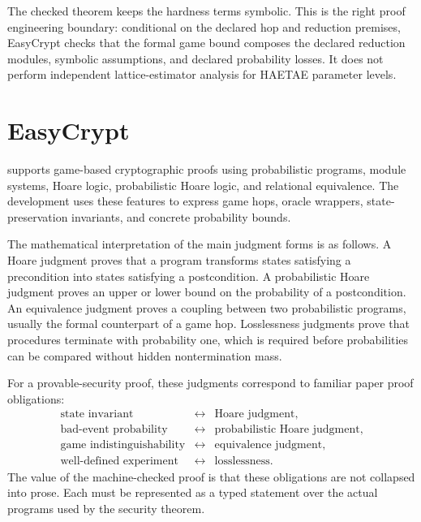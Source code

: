 The checked theorem keeps the hardness terms symbolic.  This is the right proof
engineering boundary: conditional on the declared hop and reduction premises,
EasyCrypt checks that the formal game bound composes the declared reduction
modules, symbolic assumptions, and declared probability losses.  It does not
perform independent lattice-estimator analysis for HAETAE parameter levels.

\section{EasyCrypt}

\easycrypt{} supports game-based cryptographic proofs using probabilistic
programs, module systems, Hoare logic, probabilistic Hoare logic, and relational
equivalence.  The \haetae{} development uses these features to express game
hops, oracle wrappers, state-preservation invariants, and concrete probability
bounds.

The mathematical interpretation of the main judgment forms is as follows.
A Hoare judgment proves that a program transforms states satisfying a
precondition into states satisfying a postcondition.  A probabilistic Hoare
judgment proves an upper or lower bound on the probability of a postcondition.
An equivalence judgment proves a coupling between two probabilistic programs,
usually the formal counterpart of a game hop.  Losslessness judgments prove that
procedures terminate with probability one, which is required before probabilities
can be compared without hidden nontermination mass.

For a provable-security proof, these judgments correspond to familiar paper
proof obligations:
\[
\begin{array}{rcl}
\text{state invariant} &\leftrightarrow& \text{Hoare judgment},\\
\text{bad-event probability} &\leftrightarrow& \text{probabilistic Hoare judgment},\\
\text{game indistinguishability} &\leftrightarrow& \text{equivalence judgment},\\
\text{well-defined experiment} &\leftrightarrow& \text{losslessness}.
\end{array}
\]
The value of the machine-checked proof is that these obligations are not
collapsed into prose.  Each must be represented as a typed statement over the
actual programs used by the security theorem.
